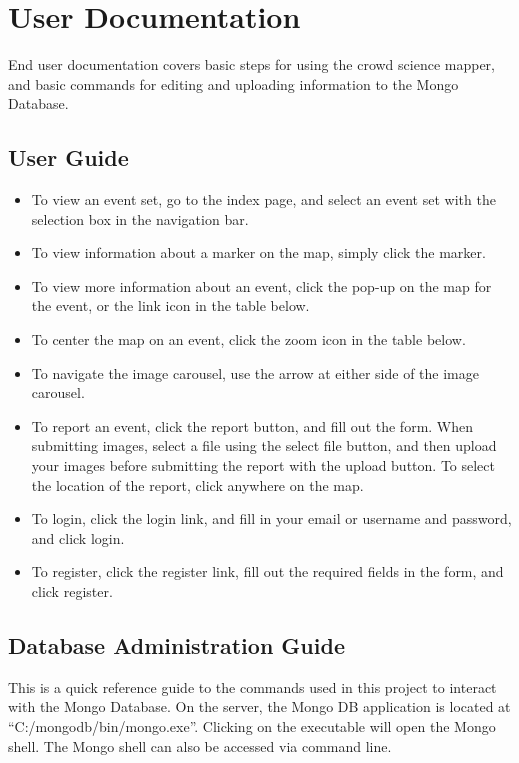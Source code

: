 
\chapter{User Documentation}
End user documentation covers basic steps for using the crowd science mapper, and basic commands for editing and uploading information to the Mongo Database.

\section{User Guide}
\begin{itemize}
\item To view an event set, go to the index page, and select an event set with the selection box in the navigation bar. 
\item To view information about a marker on the map, simply click the marker. 
\item To view more information about an event, click the pop-up on the map for the event, or the link icon in the table below. 
\item To center the map on an event, click the zoom icon in the table below. 
\item To navigate the image carousel, use the arrow at either side of the image carousel. 
\item To report an event, click the report button, and fill out the form. When submitting images, select a file using the select file button, and then upload your images before submitting the report with the upload button. To select the location of the report, click anywhere on the map. 
\item To login, click the login link, and fill in your email or username and password, and click login. 
\item To register, click the register link, fill out the required fields in the form, and click register.
\end{itemize}
\section{Database Administration Guide}
This is a quick reference guide to the commands used in this project to interact with the Mongo Database. On the server, the Mongo DB application is located at ``C:/mongodb/bin/mongo.exe''. Clicking on the executable will open the Mongo shell. The Mongo shell can also be accessed via command line. 

